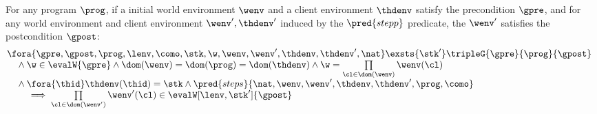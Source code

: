 \begin{theorem}
\label{def:soundness-prog}
For any program \( \prog \), if a initial world environment \( \wenv \) and a client environment \( \thdenv \) satisfy the precondition \( \gpre \), and for any world environment and client environment \( \wenv', \thdenv' \) induced by the \( \pred{stepp} \) predicate, the \( \wenv' \) satisfies the postcondition \( \gpost \):
\[
\begin{array}{@{}l}
\fora{\gpre, \gpost, \prog, \lenv, \como, \stk, \w, \wenv, \wenv', \thdenv, \thdenv', \nat}  \exsts{\stk'}
    \tripleG{\gpre}{\prog}{\gpost} \\
    \quad {} \land \w \in \evalW{\gpre}
    \land \dom(\wenv) = \dom(\prog) = \dom(\thdenv)
    \land \w = \prod\limits_{\cl \in \dom(\wenv)} \wenv(\cl) \\
    \quad {} \land \fora{\thid} \thdenv(\thid) = \stk
    \land \pred{steps}{\nat,\wenv, \wenv', \thdenv, \thdenv',\prog, \como}  \\
    \qquad {} \implies \prod\limits_{\cl \in \dom(\wenv')} \wenv'(\cl) \in \evalW[\lenv, \stk']{\gpost}
\end{array}
\] 
\end{theorem}
